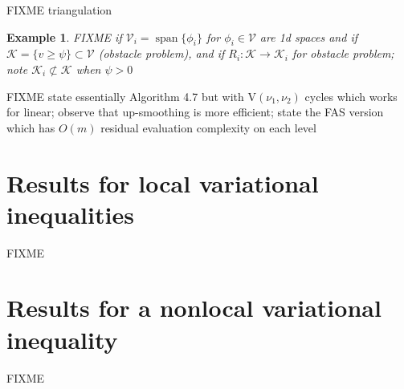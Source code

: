 \documentclass[letterpaper,final,12pt,reqno]{amsart}
\theoremstyle{cstyle}
\theoremstyle{dstyle}
\newtheorem{example}[theorem]{Example}
\numberwithin{equation}{section}
\numberwithin{figure}{section}
\numberwithin{table}{section}
\numberwithin{theorem}{section}
\newcommand{\cK}{\mathcal{K}}
\newcommand{\cV}{\mathcal{V}}
\newcommand{\Span}{\operatorname{span}}
\begin{document}
FIXME triangulation

\begin{example}  FIXME if $\cV_i=\Span\{\phi_i\}$ for $\phi_i\in\cV$ are 1d spaces and if $\cK = \{v \ge \psi\} \subset \cV$ (obstacle problem), and if $R_i : \cK \to \cK_i$ for obstacle problem; note $\cK_i \not\subset \cK$ when $\psi>0$
\end{example}

FIXME state essentially Algorithm 4.7 \cite{GraeserKornhuber2009} but with $\text{V}(\nu_1,\nu_2)$ cycles which works for linear; observe that up-smoothing is more efficient; state the FAS version which has $O(m)$ residual evaluation complexity on each level


\section{Results for local variational inequalities} \label{sec:resultslocal}

FIXME


\section{Results for a nonlocal variational inequality} \label{sec:resultsnonlocal}

FIXME


\small


\end{document}
